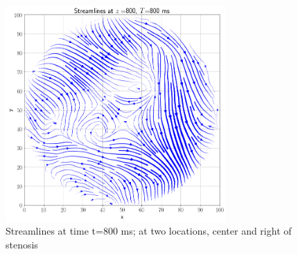 \documentclass[11pt]{article} %
\begin{document}
\begin{figure}[H]
\centering
\hspace*{-0.25in}
\vspace*{-0.50in}
\includegraphics[width=0.75\textwidth]{streamlines/streamlines_z_800_t_800.png}
\caption{Streamlines at time t=800 ms; at two locations, center and right of stenosis}
\end{figure}
\end{document}
